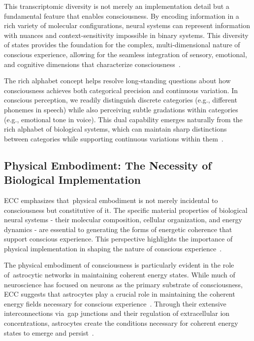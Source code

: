 This transcriptomic diversity is not merely an implementation detail but a fundamental feature that enables consciousness. By encoding information in a rich variety of molecular configurations, neural systems can represent information with nuances and context-sensitivity impossible in binary systems. This diversity of states provides the foundation for the complex, multi-dimensional nature of conscious experience, allowing for the seamless integration of sensory, emotional, and cognitive dimensions that characterize consciousness~\cite{levin2019computational,seth2021being}.

The rich alphabet concept helps resolve long-standing questions about how consciousness achieves both categorical precision and continuous variation. In conscious perception, we readily distinguish discrete categories (e.g., different phonemes in speech) while also perceiving subtle gradations within categories (e.g., emotional tone in voice). This dual capability emerges naturally from the rich alphabet of biological systems, which can maintain sharp distinctions between categories while supporting continuous variations within them~\cite{Freedman2011,juarrero2023context}.

\subsection*{Physical Embodiment: The Necessity of Biological Implementation}

ECC emphasizes that~physical embodiment is not merely incidental to consciousness but constitutive of it. The specific material properties of biological neural systems - their molecular composition, cellular organization, and energy dynamics - are essential to generating the forms of energetic coherence that support conscious experience. This perspective highlights the importance of physical implementation in shaping the nature of conscious experience~\cite{varela1991embodied,clark2013whatever}.

The physical embodiment of consciousness is particularly evident in the role of~astrocytic networks in maintaining coherent energy states. While much of neuroscience has focused on neurons as the primary substrate of consciousness, ECC suggests that astrocytes play a crucial role in maintaining the coherent energy fields necessary for conscious experience~\cite{Bazargani2016}. Through their extensive interconnections via~gap junctions and their regulation of extracellular ion concentrations, astrocytes create the conditions necessary for coherent energy states to emerge and persist~\cite{Giaume2010}.

